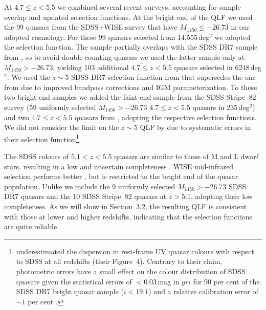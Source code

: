\documentclass[fleqn,usenatbib]{mnras}
\begin{document}
At $4.7\le z<5.5$ we combined several recent surveys, accounting for
sample overlap and updated selection functions. At the bright end of
the QLF we used the 99 quasars from the SDSS+WISE survey
\citep{2016ApJ...829...33Y} that have $M_{1450}\le -26.73$ in our adopted
cosmology.  For these 99 quasars selected from 14,555\,deg$^2$ we
adopted the \citet{2016ApJ...829...33Y} selection function.  The
\citet{2016ApJ...829...33Y} sample partially overlaps with the SDSS
DR7 sample from \citet{2013ApJ...768..105M}, so to avoid
double-counting quasars we used the latter sample only at
$M_{1450}>-26.73$, yielding 103 additional $4.7\le z<5.5$ quasars selected in
6248\,deg$^2$. We used the $z\sim 5$ SDSS DR7 selection function from
\citet{2013ApJ...768..105M} that supersedes the one from
\citet{2006AJ....131.2766R} due to improved bandpass corrections and IGM
parameterization.  To these two bright-end samples we added the
faint-end sample from the \citet{2013ApJ...768..105M} SDSS Stripe~82
survey (59 uniformly selected $M_{1450}>-26.73$ $4.7\le z<5.5$ quasars in 235\,deg$^2$)
and two $4.7\le z<5.5$ quasars from \citet{2011ApJ...728L..26G},
adopting the respective selection functions.  We did not consider the
limit on the $z\sim 5$ QLF by \citet{2012ApJ...756..160I} due to
systematic errors in their selection
function\footnote{\citet{2012ApJ...756..160I} underestimated the
  dispersion in rest-frame UV quasar colours with respect to SDSS at
  all redshifts (their Figure~4). Contrary to their claim, photometric
  errors have a small effect on the colour distribution of SDSS
  quasars given the statistical errors of $<0.03$\,mag in $gri$ for 90
  per cent of the SDSS DR7 bright quasar sample ($i<19.1$) and a
  relative calibration error of $\sim 1$ per cent
  \citep{2008ApJ...674.1217P}.}.

The SDSS colours of $5.1<z<5.5$ quasars are similar to those of M and
L dwarf stars, resulting in a low and uncertain completeness
\citep{2013ApJ...768..105M}. WISE mid-infrared selection performs
better \citep{2016ApJ...829...33Y}, but is restricted to the bright
end of the quasar population. Unlike \citet{2013ApJ...768..105M} we
include the 9 uniformly selected $M_{1450}>-26.73$ SDSS DR7 quasars
and the 10 SDSS Stripe~82 quasars at $z>5.1$, adopting their low
completeness. As we will show in Section~3.2, the resulting
QLF is consistent with those at lower and higher redshifts, indicating
that the \citet{2013ApJ...768..105M} selection functions are quite
reliable.
\end{document}
